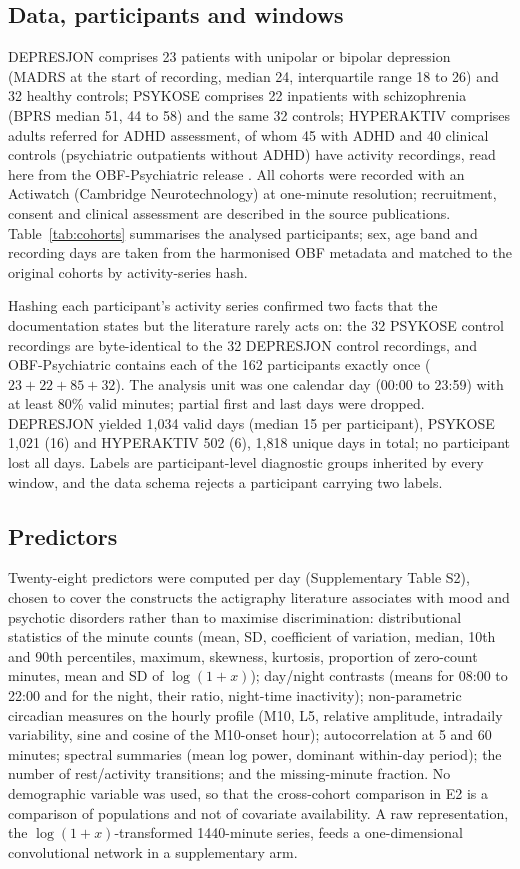 \documentclass[11pt,a4paper]{article}
\begin{document}
\subsection{Data, participants and windows}

DEPRESJON \cite{garciaceja2018} comprises 23 patients with unipolar or bipolar depression
(MADRS at the start of recording, median 24, interquartile range 18 to 26) and 32 healthy
controls; PSYKOSE \cite{jakobsen2020} comprises 22 inpatients with schizophrenia (BPRS median
51, 44 to 58) and the same 32 controls; HYPERAKTIV \cite{hicks2021} comprises adults referred
for ADHD assessment, of whom 45 with ADHD and 40 clinical controls (psychiatric outpatients
without ADHD) have activity recordings, read here from the OBF-Psychiatric release
\cite{obf2025}. All cohorts were recorded with an Actiwatch (Cambridge Neurotechnology) at
one-minute resolution; recruitment, consent and clinical assessment are described in the
source publications. Table~\ref{tab:cohorts} summarises the analysed participants; sex, age
band and recording days are taken from the harmonised OBF metadata and matched to the
original cohorts by activity-series hash.

Hashing each participant's activity series confirmed two facts that the documentation states
but the literature rarely acts on: the 32 PSYKOSE control recordings are byte-identical to the
32 DEPRESJON control recordings, and OBF-Psychiatric contains each of the 162 participants
exactly once ($23 + 22 + 85 + 32$). The analysis unit was one calendar day (00:00 to 23:59) with
at least 80\% valid minutes; partial first and last days were dropped. DEPRESJON yielded
1{,}034 valid days (median 15 per participant), PSYKOSE 1{,}021 (16) and HYPERAKTIV 502 (6),
1{,}818 unique days in total; no participant lost all days. Labels are participant-level
diagnostic groups inherited by every window, and the data schema rejects a participant carrying
two labels.

\subsection{Predictors}
Twenty-eight predictors were computed per day (Supplementary Table S2), chosen to cover the
constructs the actigraphy literature associates with mood and psychotic disorders rather than to
maximise discrimination: distributional statistics of the minute counts (mean, SD, coefficient
of variation, median, 10th and 90th percentiles, maximum, skewness, kurtosis, proportion of
zero-count minutes, mean and SD of $\log(1+x)$); day/night contrasts (means for 08:00 to 22:00
and for the night, their ratio, night-time inactivity); non-parametric circadian measures on the
hourly profile (M10, L5, relative amplitude, intradaily variability, sine and cosine of the
M10-onset hour); autocorrelation at 5 and 60 minutes; spectral summaries (mean log power, dominant
within-day period); the number of rest/activity transitions; and the missing-minute fraction. No
demographic variable was used, so that the cross-cohort comparison in E2 is a comparison of
populations and not of covariate availability. A raw representation, the $\log(1+x)$-transformed
1440-minute series, feeds a one-dimensional convolutional network in a supplementary arm.
\end{document}
